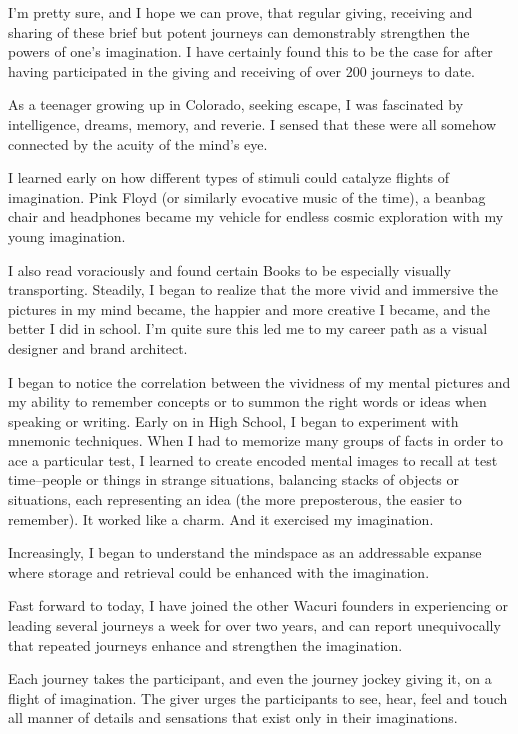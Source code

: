 \documentclass[12pt]{book}
\begin{document}
I'm pretty sure, and I hope we can prove, that regular giving,
receiving and sharing of these brief but potent journeys can
demonstrably strengthen the powers of one’s imagination. I have
certainly found this to be the case for after having participated in
the giving and receiving of over 200 journeys to date.

As a teenager growing up in Colorado, seeking escape, I was fascinated
by intelligence, dreams, memory, and reverie. I sensed that these were
all somehow connected by the acuity of the mind’s eye.

I learned early on how different types of stimuli could catalyze
flights of imagination. Pink Floyd (or similarly evocative music of
the time), a beanbag chair and headphones became my vehicle for
endless cosmic exploration with my young imagination.

I also read voraciously and found certain Books to be especially
visually transporting. Steadily, I began to realize that the more
vivid and immersive the pictures in my mind became, the happier and
more creative I became, and the better I did in school. I'm quite sure
this led me to my career path as a visual designer and brand
architect.

I began to notice the correlation between the vividness of my mental
pictures and my ability to remember concepts or to summon the right
words or ideas when speaking or writing. Early on in High School, I
began to experiment with mnemonic techniques. When I had to memorize
many groups of facts in order to ace a particular test, I learned to
create encoded mental images to recall at test time--people or things
in strange situations, balancing stacks of objects or situations, each
representing an idea (the more preposterous, the easier to
remember). It worked like a charm. And it exercised my imagination.

Increasingly, I began to understand the mindspace as an addressable
expanse where storage and retrieval could be enhanced with the
imagination.

Fast forward to today, I have joined the other Wacuri founders in
experiencing or leading several journeys a week for over two years,
and can report unequivocally that repeated journeys enhance and
strengthen the imagination.

Each journey takes the participant, and even the journey jockey giving
it, on a flight of imagination. The giver urges the participants to
see, hear, feel and touch all manner of details and sensations that
exist only in their imaginations.
\end{document}
